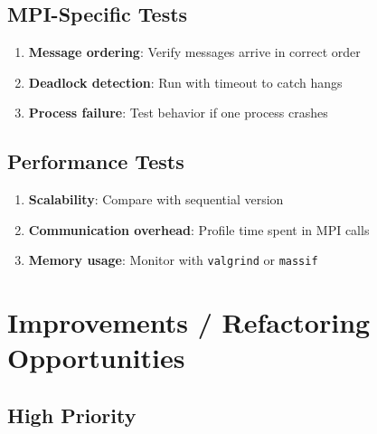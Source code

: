 \documentclass[11pt,a4paper]{article}
\begin{document}
\subsection{MPI-Specific Tests}

\begin{enumerate}
    \item \textbf{Message ordering}: Verify messages arrive in correct order
    \item \textbf{Deadlock detection}: Run with timeout to catch hangs
    \item \textbf{Process failure}: Test behavior if one process crashes
\end{enumerate}

\subsection{Performance Tests}

\begin{enumerate}
    \item \textbf{Scalability}: Compare with sequential version
    \item \textbf{Communication overhead}: Profile time spent in MPI calls
    \item \textbf{Memory usage}: Monitor with \texttt{valgrind} or \texttt{massif}
\end{enumerate}

\section{Improvements / Refactoring Opportunities}

\subsection{High Priority}
\end{document}
